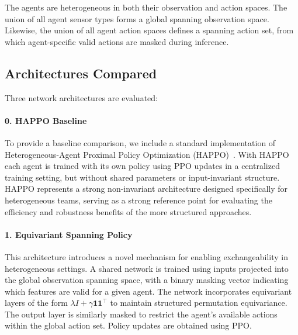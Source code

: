 The agents are heterogeneous in both their observation and action spaces. 
The union of all agent sensor types forms a global spanning observation space. 
Likewise, the union of all agent action spaces defines a spanning action set, 
from which agent-specific valid actions are masked during inference.

\subsection{Architectures Compared}
Three network architectures are evaluated:

\paragraph{0. HAPPO Baseline}
To provide a baseline comparison, we include a standard implementation 
of Heterogeneous-Agent Proximal Policy Optimization (HAPPO)~\cite{zhong2024}. 
With HAPPO each agent is trained with its own policy using PPO updates in a centralized 
training setting, but without shared parameters or input-invariant structure. 
HAPPO represents a strong non-invariant architecture designed specifically 
for heterogeneous teams, serving as a strong reference point for evaluating the 
efficiency and robustness benefits of the more structured approaches.


\paragraph{1. Equivariant Spanning Policy}
This architecture introduces a novel mechanism for enabling 
exchangeability in heterogeneous settings. A shared network 
is trained using inputs projected into the global observation 
spanning space, with a binary masking vector indicating which 
features are valid for a given agent. The network incorporates 
equivariant layers of the form $\lambda I + \gamma \mathbf{11}^\top$ 
to maintain structured permutation equivariance. The output layer 
is similarly masked to restrict the agent's available actions 
within the global action set. Policy updates are obtained using PPO.

